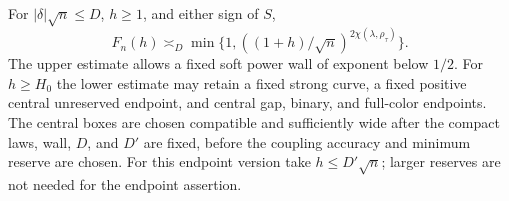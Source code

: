 \begin{theorem}\label{pr:one}
For $|\delta|\sqrt n\le D$, $h\ge1$, and either sign of $S$,
\begin{equation}
 F_n(h)\asymp_D
 \min\{1,((1+h)/\sqrt n)^{2\chi(\lambda,\rho_\tau)}\}.
 \label{pr:ONE}
\end{equation}
The upper estimate allows a fixed soft power wall of exponent below
$1/2$. For $h\ge H_0$ the lower estimate may retain a fixed strong curve,
a fixed positive central unreserved endpoint, and central gap, binary,
and full-color endpoints. The central boxes are chosen compatible and
sufficiently wide after the compact laws, wall, $D$, and $D'$ are fixed,
before the coupling accuracy and minimum reserve are chosen.
For this endpoint version take $h\le D'\sqrt n$;
larger reserves are not needed for the endpoint assertion.
\end{theorem}
